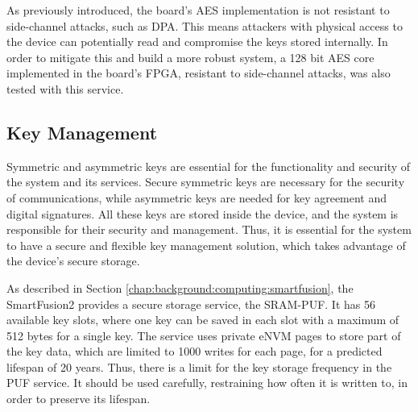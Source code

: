 As previously introduced, the board's AES implementation is not resistant to side-channel attacks, such as DPA. This means attackers with physical access to the device can potentially read and compromise the keys stored internally. In order to mitigate this and build a more robust system, a 128 bit AES core implemented in the board's FPGA, resistant to side-channel attacks, was also tested with this service.

\subsection{Key Management}\label{chap:implementation:services:key-import}

Symmetric and asymmetric keys are essential for the functionality and security of the system and its services. Secure symmetric keys are necessary for the security of communications, while asymmetric keys are needed for key agreement and digital signatures.
All these keys are stored inside the device, and the system is responsible for their security and management. Thus, it is essential for the system to have a secure and flexible key management solution, which takes advantage of the device's secure storage.

As described in Section \ref{chap:background:computing:smartfusion}, the SmartFusion2 provides a secure storage service, the SRAM-PUF. It has 56 available key slots, where one key can be saved in each slot with a maximum of 512 bytes for a single key.
The service uses private eNVM pages to store part of the key data, which are limited to 1000 writes for each page, for a predicted lifespan of 20 years. Thus, there is a limit for the key storage frequency in the PUF service. It should be used carefully, restraining how often it is written to, in order to preserve its lifespan.

